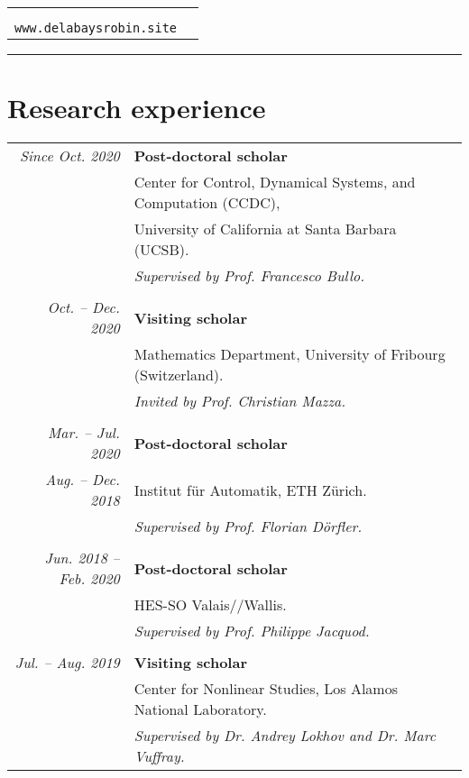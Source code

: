 \documentclass[10pt]{article}
\begin{document}

\begin{tabular}{ll}
\begin{minipage}{5cm}
\flushleft
\hspace{-.9cm}
{\Huge\textcolor{hei}{Robin Delabays}}\\
\end{minipage}
& 
\begin{minipage}{9.2cm}
\flushright
\texttt{robindelabays@ucsb.edu}\\
\vspace{1mm}
\texttt{www.delabaysrobin.site}
\end{minipage}
\end{tabular}

\vspace{.3cm}

\begin{center}
\noindent\textcolor{hei}{\rule{.8\textwidth}{1pt}}
\end{center}


\section*{Research experience}

\begin{tabular}{rl}
 \textit{Since Oct. 2020} & \textbf{Post-doctoral scholar} \\
 & Center for Control, Dynamical Systems, and Computation (CCDC), \\ & University of California at Santa Barbara (UCSB). \\
 & {\it Supervised by Prof. Francesco Bullo.} \\
 &\\
 \textit{Oct. -- Dec. 2020} & \textbf{Visiting scholar} \\
 & Mathematics Department, University of Fribourg (Switzerland). \\
 & {\it Invited by Prof. Christian Mazza.} \\
 & \\
 \textit{Mar. -- Jul. 2020} & \textbf{Post-doctoral scholar} \\
 \textit{Aug. -- Dec. 2018} & Institut f\"ur Automatik, ETH Z\"urich. \\
 & {\it Supervised by Prof. Florian D\"orfler.} \\
 &\\
 \textit{Jun. 2018 -- Feb. 2020} & \textbf{Post-doctoral scholar} \\
 & HES-SO Valais//Wallis. \\
 & {\it Supervised by Prof. Philippe Jacquod.} \\
 &\\
 \textit{Jul. -- Aug. 2019} & \textbf{Visiting scholar} \\
 & Center for Nonlinear Studies, Los Alamos National Laboratory. \\
 & {\it Supervised by Dr. Andrey Lokhov and Dr. Marc Vuffray.} \\
\end{tabular}
\end{document}
